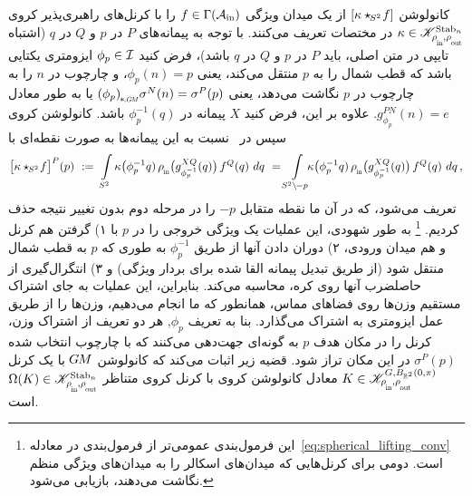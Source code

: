 \citet{Cohen2018-intertwiners} کانولوشن ${[\kappa \star_{\mkern-2mu S^2}\! f]}$ از یک میدان ویژگی $f\in\Gamma(\mathcal{A}_\textup{in})$ را با کرنل‌های راهبری‌پذیر کروی $\kappa \in \mathscr{K}^{\Stab{n}}_{\rhoin\mkern-1mu,\rhoout}$ در مختصات تعریف می‌کنند.
با توجه به پیمانه‌های $P$ در $p$ و $Q$ در $q$ (اشتباه تایپی در متن اصلی، باید $P$ در $p$ و $Q$ در $q$ باشد)، فرض کنید $\phi_p \in \mathcal{I}$ ایزومتری یکتایی باشد که قطب شمال را به $p$ منتقل می‌کند، یعنی $\phi_p(n) = p$، و چارچوب در $n$ را به چارچوب در $p$ نگاشت می‌دهد، یعنی $\dphipGM \sigma^N(n) = \sigma^P(p)$ یا به طور معادل $g_{\phi_p}^{PN}(n) = e$.
علاوه بر این، فرض کنید $X$ پیمانه در $\phi_p^{-1}(q)$ باشد.
کانولوشن کروی سپس در~\cite{Cohen2018-intertwiners} نسبت به این پیمانه‌ها به صورت نقطه‌ای با
\begin{align}\label{eq:spherical_steerable_conv}
	\big[\kappa \star_{\mkern-2mu S^2}\! f\big]^P(p)
	\ :=\ \int\limits_{S^2} \kappa\big(\phi_p^{-1}q)\, \rhoin\big( g_{\phi_p^{-1}}^{XQ}(q) \big)\, f^Q(q)\ dq
	\ = \int\limits_{S^2 \backslash \mkern-2mu -p} \mkern-8mu \kappa\big(\phi_p^{-1}q)\, \rhoin\big( g_{\phi_p^{-1}}^{XQ}(q) \big)\, f^Q(q)\ dq \,,
\end{align}
تعریف می‌شود، که در آن ما نقطه متقابل $-p$ را در مرحله دوم بدون تغییر نتیجه حذف کردیم.%
\footnote{
	این فرمول‌بندی عمومی‌تر از فرمول‌بندی در معادله~\eqref{eq:spherical_lifting_conv} است.
	دومی برای کرنل‌هایی که میدان‌های اسکالر را به میدان‌های ویژگی منظم نگاشت می‌دهند، بازیابی می‌شود.
}
به طور شهودی، این عملیات یک ویژگی خروجی را در $p$ با
۱) گرفتن هم کرنل و هم میدان ورودی،
۲) دوران دادن آنها از طریق $\phi_p^{-1}$ به طوری که $p$ به قطب شمال منتقل شود (از طریق تبدیل پیمانه القا شده برای بردار ویژگی) و
۳) انتگرال‌گیری از حاصلضرب آنها روی کره، محاسبه می‌کند.
بنابراین، این عملیات به جای اشتراک مستقیم وزن‌ها روی فضاهای مماس، همانطور که ما انجام می‌دهیم، وزن‌ها را از طریق عمل ایزومتری به اشتراک می‌گذارد.
بنا به تعریف $\phi_p$, هر دو تعریف از اشتراک وزن، کرنل را در مکان هدف $p$ به گونه‌ای جهت‌دهی می‌کنند که با چارچوب انتخاب شده $\sigma^P(p)$ در این مکان تراز شود.
قضیه زیر اثبات می‌کند که کانولوشن $G\mkern-1.4muM$ با یک کرنل $K \in \mathscr{K}^{G,B_{\R^2}(0,\pi)}_{\rhoin\mkern-1mu,\rhoout}$ معادل کانولوشن کروی با کرنل کروی متناظر $\Omega(K) \in \mathscr{K}^{\Stab{n}}_{\rhoin\mkern-1mu,\rhoout}$ است.
